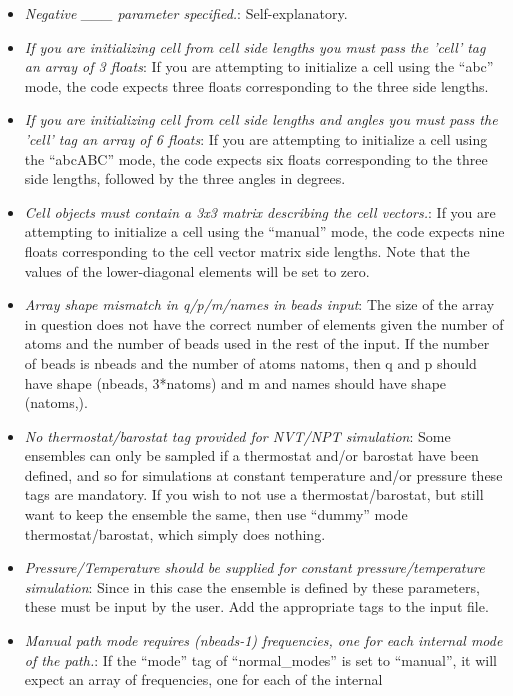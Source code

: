 \documentclass[11pt,english,fleqn]{report}
\begin{document}
\begin{itemize}
\item \emph{Negative \_\_\_ parameter specified.}: Self-explanatory.
\item \emph{If you are initializing cell from cell side lengths you must pass the 'cell' tag an array of 3 floats}:
If you are attempting to initialize a cell using the {}``abc'' mode,
the code expects three floats corresponding to the three side lengths. 
\item \emph{If you are initializing cell from cell side lengths and angles you must pass the 'cell' tag an array of 6 floats}:
If you are attempting to initialize a cell using the {}``abcABC''
mode, the code expects six floats corresponding to the three side
lengths, followed by the three angles in degrees.
\item \emph{Cell objects must contain a 3x3 matrix describing the cell vectors.}:
If you are attempting to initialize a cell using the {}``manual''
mode, the code expects nine floats corresponding to the cell vector
matrix side lengths. Note that the values of the lower-diagonal elements
will be set to zero.
\item \emph{Array shape mismatch in q/p/m/names in beads input}: The size
of the array in question does not have the correct number of elements
given the number of atoms and the number of beads used in the rest
of the input. If the number of beads is nbeads and the number of atoms
natoms, then q and p should have shape (nbeads, 3{*}natoms) and m
and names should have shape (natoms,).
\item \emph{No thermostat/barostat tag provided for \emph{NVT}/\emph{NPT} simulation}:
Some ensembles can only be sampled if a thermostat and/or barostat
have been defined, and so for simulations at constant temperature
and/or pressure these tags are mandatory. If you wish to not use a
thermostat/barostat, but still want to keep the ensemble the same,
then use {}``dummy'' mode thermostat/barostat, which simply does
nothing.
\item \emph{Pressure/Temperature should be supplied for constant pressure/temperature simulation}:
Since in this case the ensemble is defined by these parameters, these
must be input by the user. Add the appropriate tags to the input file.
\item \emph{Manual path mode requires (nbeads-1) frequencies, one for each internal mode of the path.}:
If the {}``mode'' tag of {}``normal\_modes'' is set to {}``manual'',
it will expect an array of frequencies, one for each of the internal

\end{itemize}
\end{document}
